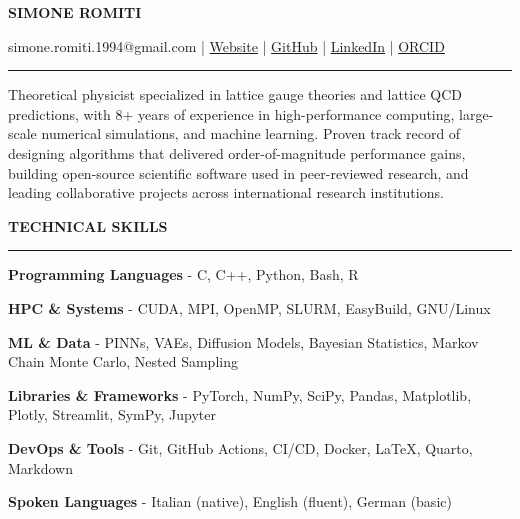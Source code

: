 \documentclass[
  18,
]{article}
\author{}
\date{}
\begin{document}
\begin{huge}\begin{center}{\bf SIMONE ROMITI}\end{center}\end{huge}

\begin{center}
simone.romiti.1994@gmail.com |
\href{https://simone-romiti.github.io/}{Website} | 
\href{https://github.com/simone-romiti}{GitHub} | 
\href{https://www.linkedin.com/in/simone-romiti/}{LinkedIn} |
\href{https://orcid.org/0000-0002-6509-447X}{ORCID}
\end{center}
\vspace{15pt}

\hrule

\begin{large}



Theoretical physicist specialized in lattice gauge theories and lattice QCD predictions, with 8+ years of experience in high-performance computing, large-scale numerical simulations, and machine learning. 
Proven track record of designing algorithms that delivered order-of-magnitude performance gains, building open-source scientific software used in peer-reviewed research, and leading collaborative projects across international research institutions.




\end{large}

\vspace{9pt}

\begin{large}{\bf TECHNICAL SKILLS}
  \vspace{9pt}
  \hrule
  \vspace{9pt}
\end{large}
\vspace{-0.15cm}

\begin{large}

\textbf{Programming Languages} - C, C++, Python, Bash, R

\vspace{-0.15cm}
\textbf{HPC \& Systems} - CUDA, MPI, OpenMP, SLURM, EasyBuild, GNU/Linux

\vspace{-0.15cm}
\textbf{ML \& Data} - PINNs, VAEs, Diffusion Models, Bayesian Statistics, Markov Chain Monte Carlo, Nested Sampling

\vspace{-0.15cm}
\textbf{Libraries \& Frameworks} - PyTorch, NumPy, SciPy, Pandas, Matplotlib, Plotly, Streamlit, SymPy, Jupyter

\vspace{-0.15cm}
\textbf{DevOps \& Tools} - Git, GitHub Actions, CI/CD, Docker, \LaTeX, Quarto, Markdown

\vspace{-0.15cm}
\textbf{Spoken Languages} - Italian (native), English (fluent), German (basic)

\end{large}
\end{document}
